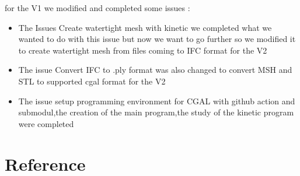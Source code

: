 \documentclass{article}
\begin{document}
for the V1 we modified and completed some issues :
\begin{itemize}
  \item The Issues Create watertight mesh with kinetic we completed what we wanted to do with this issue but now we want to go further so we modified it 
  to create watertight mesh from files coming to IFC format for the V2
  \item The issue Convert IFC to .ply format was also changed to convert MSH and STL to supported cgal format for the V2
  \item The issue setup programming environment for CGAL with github action and submodul,the creation of the main program,the study of the kinetic program were completed 
\end{itemize}

    
\nocite{*}
\section{Reference}


\end{document}
